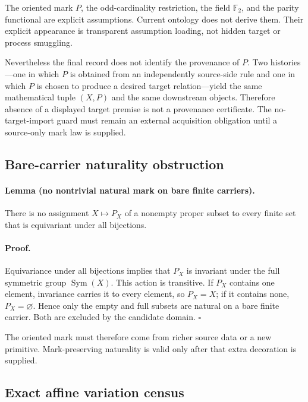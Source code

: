 The oriented mark \(P\), the odd-cardinality restriction, the field
\(\mathbb F_2\), and the parity functional are explicit assumptions.  Current
ontology does not derive them.  Their explicit appearance is transparent
assumption loading, not hidden target or process smuggling.

Nevertheless the final record does not identify the provenance of \(P\).
Two histories---one in which \(P\) is obtained from an independently
source-side rule and one in which \(P\) is chosen to produce a desired target
relation---yield the same mathematical tuple \((X,P)\) and the same downstream
objects.  Therefore absence of a displayed target premise is not a provenance
certificate.  The no-target-import guard must remain an external acquisition
obligation until a source-only mark law is supplied.

\subsection{Bare-carrier naturality obstruction}

\paragraph{Lemma (no nontrivial natural mark on bare finite carriers).}
There is no assignment \(X\mapsto P_X\) of a nonempty proper subset to every
finite set that is equivariant under all bijections.

\paragraph{Proof.}
Equivariance under all bijections implies that \(P_X\) is invariant under the
full symmetric group \(\operatorname{Sym}(X)\).  This action is transitive.
If \(P_X\) contains one element, invariance carries it to every element, so
\(P_X=X\); if it contains none, \(P_X=\varnothing\).  Hence only the empty and
full subsets are natural on a bare finite carrier.  Both are excluded by the
candidate domain. \(\square\)

The oriented mark must therefore come from richer source data or a new
primitive.  Mark-preserving naturality is valid only after that extra
decoration is supplied.

\subsection{Exact affine variation census}

